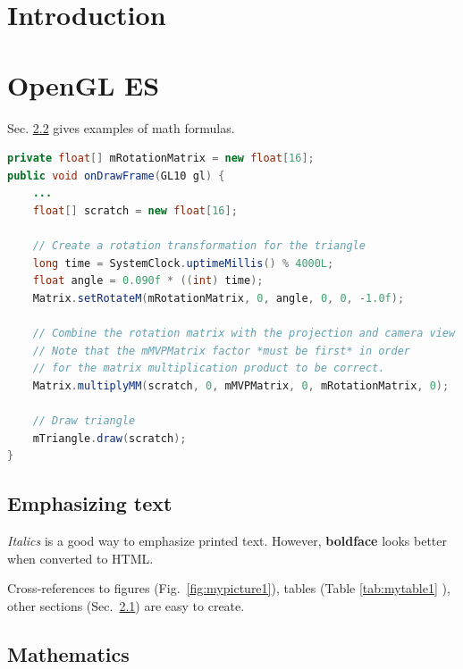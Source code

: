 \documentclass[a4paper,11pt]{article}
\begin{document}


\section{Introduction} 



\pagebreak[3]
\section{OpenGL ES}

Sec. \ref{sec:math} gives examples of math formulas.

\begin{lstlisting}[language=Java]
private float[] mRotationMatrix = new float[16];
public void onDrawFrame(GL10 gl) {
    ...
    float[] scratch = new float[16];

    // Create a rotation transformation for the triangle
    long time = SystemClock.uptimeMillis() % 4000L;
    float angle = 0.090f * ((int) time);
    Matrix.setRotateM(mRotationMatrix, 0, angle, 0, 0, -1.0f);

    // Combine the rotation matrix with the projection and camera view
    // Note that the mMVPMatrix factor *must be first* in order
    // for the matrix multiplication product to be correct.
    Matrix.multiplyMM(scratch, 0, mMVPMatrix, 0, mRotationMatrix, 0);

    // Draw triangle
    mTriangle.draw(scratch);
}
\end{lstlisting}

\subsection{Emphasizing text}\label{sec:emphasis}

\textit{Italics} is a good way to emphasize printed text. However, \textbf{boldface} looks better when converted to HTML.

Cross-references to figures (Fig.~\ref{fig:mypicture1}), tables
(Table \ref{tab:mytable1} ), other sections (Sec.~\ref{sec:emphasis})
are easy to create. 


\pagebreak[4] 
\subsection{Mathematics}\label{sec:math}
\end{document}
